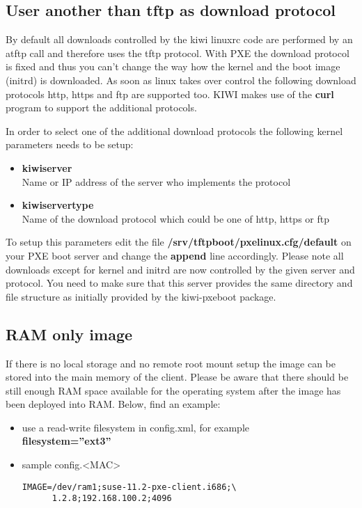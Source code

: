 \subsection{User another than tftp as download protocol}

By default all downloads controlled by the kiwi linuxrc code
are performed by an atftp call and therefore uses the tftp
protocol. With PXE the download protocol is fixed and thus you
can't change the way how the kernel and the boot image (initrd)
is downloaded. As soon as linux takes over control the following
download protocols http, https and ftp are supported too.
KIWI makes use of the \textbf{curl} program to support the
additional protocols.

In order to select one of the additional download protocols
the following kernel parameters needs to be setup:

\begin{itemize}
\item \textbf{kiwiserver}\\
      Name or IP address of the server who implements the protocol
\item \textbf{kiwiservertype}\\
      Name of the download protocol which could be one of http, https 
      or ftp
\end{itemize}

To setup this parameters edit the file
\textbf{/srv/tftpboot/pxelinux.cfg/default} on your PXE boot server
and change the \textbf{append} line accordingly. Please note all
downloads except for kernel and initrd are now controlled by the given
server and protocol. You need to make sure that this server provides
the same directory and file structure as initially provided by
the kiwi-pxeboot package.

\subsection{RAM only image}

If there is no local storage and no remote root mount setup
the image can be stored into the main memory of the client.
Please be aware that there should be still enough RAM space
available for the operating system after the image has been
deployed into RAM. Below, find an example:

\begin{itemize}
\item use a read-write filesystem in config.xml, for example\\
      \textbf{filesystem=''ext3''}
\item sample config.<MAC>

\begin{Command}{12cm}
\begin{verbatim}
IMAGE=/dev/ram1;suse-11.2-pxe-client.i686;\
      1.2.8;192.168.100.2;4096
\end{verbatim}
\end{Command}
\end{itemize}

